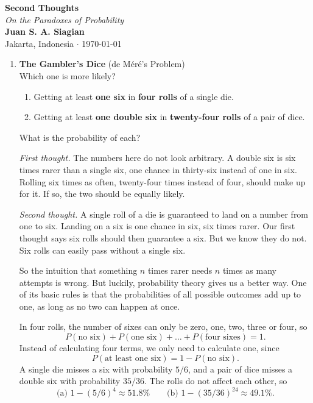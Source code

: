 \documentclass[11pt,a4paper]{article}
\begin{document}
\begin{center}
    \vspace*{2em}
    {\Huge \textbf{Second Thoughts}}\\[0.5em]
    {\Large \textit{On the Paradoxes of Probability}}\\[2em]

    {\large \textbf{Juan S. A. Siagian}}\\[0.5em]
    {\normalsize Jakarta, Indonesia \hspace{0.5em} $\cdot$ \hspace{0.5em} \today}\\[3em]
\end{center}

\begin{enumerate}
    \item \textbf{The Gambler's Dice} (de Méré's Problem) \\
    Which one is more likely?
    \begin{enumerate}
        \item Getting at least \textbf{one six} in \textbf{four rolls} of a single die.
        \item Getting at least \textbf{one double six} in \textbf{twenty-four rolls} of a pair of dice.
    \end{enumerate}
    What is the probability of each?

    \textit{First thought.} The numbers here do not look arbitrary. A double six is six times rarer than a single six, one chance in thirty-six instead of one in six. Rolling six times as often, twenty-four times instead of four, should make up for it. If so, the two should be equally likely.

    \textit{Second thought.} A single roll of a die is guaranteed to land on a number from one to six. Landing on a six is one chance in six, six times rarer. Our first thought says six rolls should then guarantee a six. But we know they do not. Six rolls can easily pass without a single six.

    So the intuition that something $n$ times rarer needs $n$ times as many attempts is wrong. But luckily, probability theory gives us a better way. One of its basic rules is that the probabilities of all possible outcomes add up to one, as long as no two can happen at once.

    In four rolls, the number of sixes can only be zero, one, two, three or four, so
    \[
        P(\text{no six}) + P(\text{one six}) + \dots + P(\text{four sixes}) = 1.
    \]
    Instead of calculating four terms, we only need to calculate one, since
    \[
        P(\text{at least one six}) = 1 - P(\text{no six}).
    \]
    A single die misses a six with probability $5/6$, and a pair of dice misses a double six with probability $35/36$. The rolls do not affect each other, so
    \[
        \text{(a) } 1 - (5/6)^{4} \approx 51.8\% \qquad \text{(b) } 1 - (35/36)^{24} \approx 49.1\%.
    \]


\end{enumerate}
\end{document}
